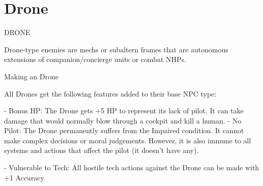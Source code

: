 \section{Drone}
                                                    DRONE

Drone-type enemies are mechs or subaltern frames that are autonomous extensions of
companion/concierge units or combat NHPs.

Making an Drone

All Drones get the following features added to their base NPC type:

    -    Bonus HP: The Drone gets +5 HP to represent its lack of pilot. It can take damage that
         would normally blow through a cockpit and kill a human.
    -    No Pilot: The Drone permanently suffers from the Impaired condition. It cannot make
         complex decisions or moral judgements. However, it is also immune to all systems and
         actions that affect the pilot (it doesn’t have any).




     -   Vulnerable to Tech: All hostile tech actions against the Drone can be made with +1
         Accuracy